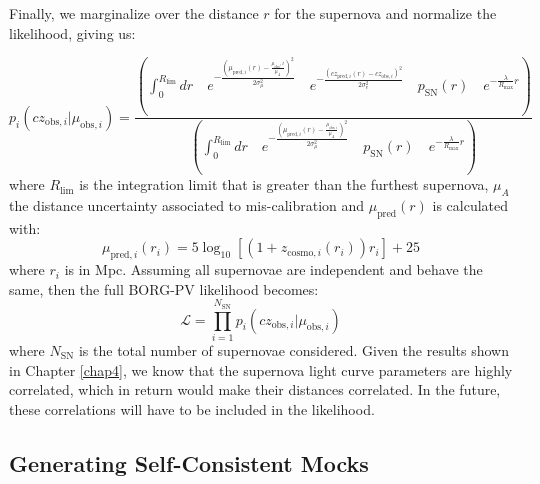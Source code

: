 Finally, we marginalize over the distance $r$ for the supernova and normalize the likelihood, giving us:

\begin{equation}
    p_i(cz_{\text{obs},i}|\mu_{\text{obs},i})= \frac{\left( \int_{0}^{R_{\text{lim}}} dr \quad e^{- \frac{\left(\mu_{\text{pred},i}(r) -\frac{\mu_{\text{obs}},i}{\mu_A} \right)^2}{2\sigma_{\mu}^2} } 
    \quad e^{-\frac{(cz_{\text{pred},i}(r) - cz_{\text{obs},i})^2}{2 \sigma_v^2}} \quad p_{\text{SN}}(r) \quad e^{-\frac{\lambda}{R_{\text{max}}}r} \right)}{\left(\int_{0}^{R_{\text{lim}}} dr 
    \quad e^{- \frac{\left(\mu_{\text{pred},i}(r) -\frac{\mu_{\text{obs},i}}{\mu_A} \right)^2}{2\sigma_{\mu}^2} } 
    \quad p_{\text{SN}}(r) \quad e^{-\frac{\lambda}{R_{\text{max}}}r}\right)}
\end{equation}
where $R_{\text{lim}}$ is the integration limit that is greater than the furthest supernova, $\mu_A$ the distance uncertainty associated to mis-calibration and $\mu_{\text{pred}}(r)$ is calculated with:
\begin{equation}
    \mu_{\text{pred},i}(r_i) = 5 \log_{10} \left[ (1+z_{\text{cosmo},i}(r_i))r_i \right] + 25
    \label{eqn:mu_r}
\end{equation}
where $r_i$ is in Mpc. 
Assuming all supernovae are independent and behave the same, then the full BORG-PV likelihood becomes:
\begin{equation}
    \mathcal{L} = \prod_{i=1}^{N_{\text{SN}}} p_i(cz_{\text{obs},i}|\mu_{\text{obs},i})
\end{equation}
where $N_{\text{SN}}$ is the total number of supernovae considered. Given the results shown in Chapter \ref{chap4}, we know that the supernova light curve parameters are highly 
correlated, which in return would make their distances correlated. In the future, these correlations will have to be included in the likelihood. 

\subsection{Generating Self-Consistent Mocks}

